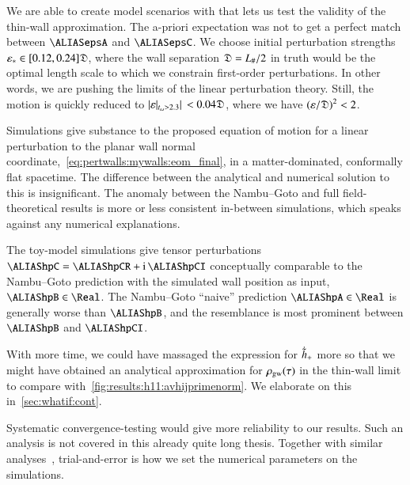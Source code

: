 







We are able to create model scenarios with \asgrd{} that lets us test the validity of the thin-wall approximation. The a-priori expectation was not to get a perfect match between $\epsA$ and $\epsC$. We choose initial perturbation strengths $\varepsilon_\ast\in[0.12, 0.24]\mathfrak{D}$, where the wall separation $\mathfrak{D}=L_\#/2$ in truth would be the optimal length scale to which we constrain first-order perturbations. 
In other words, we are pushing the limits of the linear perturbation theory. %
Still, the motion is quickly reduced to $\abs*{\varepsilon\rvert_{t_\omega >  2.3}} < 0.04 \mathfrak{D}$, where we have ${(\varepsilon/\mathfrak{D})}^2< 2$\textperthousand. 




Simulations give substance to the proposed equation of motion for a linear perturbation to the planar wall normal coordinate,~\cref{eq:pertwalls:mywalls:eom_final}, in a matter-dominated, conformally flat spacetime. The difference between the analytical and numerical solution to this is insignificant. The anomaly between the Nambu--Goto and full field-theoretical results is more or less consistent in-between simulations, which speaks against any numerical explanations.


The toy-model simulations give tensor perturbations $\hpC= \hpCR+ \im \, \hpCI $ conceptually comparable to the Nambu--Goto prediction with the simulated wall position as input, $\hpB\in \Real$. The Nambu--Goto ``naive'' prediction $\hpA\in \Real$ is generally worse than $\hpB$, and the resemblance is most prominent between $\hpB$ and $\hpCI$.



With more time, we could have massaged the expression for $\dot{\tilde{h}}_+$ more so that we might have obtained an analytical approximation for $\rho_\mathrm{gw}(\tau)$ in the thin-wall limit to compare with~\cref{fig:results:h11:avhijprimenorm}. We elaborate on this in~\cref{sec:whatif:cont}.


Systematic convergence-testing would give more reliability to our results. Such an analysis is not covered in this already quite long thesis. Together with similar analyses~\citep{christiansenAsimulationDomainFormation2024,christiansenAsevolutionRelativisticNbody2023}, trial-and-error is how we set the numerical parameters on the simulations. %

